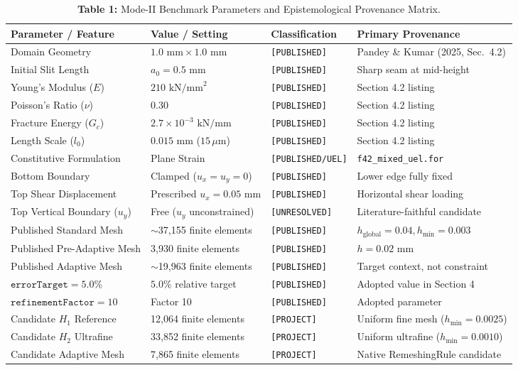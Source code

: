 \documentclass[11pt,a4paper]{article}
\begin{document}
\begin{table}[htbp]
\centering
\small
\caption{\textbf{Table 1:} Mode-II Benchmark Parameters and Epistemological Provenance Matrix.}
\label{tab:taxonomy}
\begin{tabularx}{\textwidth}{p{3.8cm}p{3.8cm}p{3.2cm}X}
\toprule
\textbf{Parameter / Feature} & \textbf{Value / Setting} & \textbf{Classification} & \textbf{Primary Provenance} \\
\midrule
Domain Geometry & $1.0\text{ mm} \times 1.0\text{ mm}$ & \texttt{[PUBLISHED]} & Pandey \& Kumar (2025, Sec.~4.2) \\
Initial Slit Length & $a_0 = 0.5\text{ mm}$ & \texttt{[PUBLISHED]} & Sharp seam at mid-height \\
Young's Modulus ($E$) & $210\text{ kN/mm}^2$ & \texttt{[PUBLISHED]} & Section 4.2 listing \\
Poisson's Ratio ($\nu$) & $0.30$ & \texttt{[PUBLISHED]} & Section 4.2 listing \\
Fracture Energy ($G_c$) & $2.7\times 10^{-3}\text{ kN/mm}$ & \texttt{[PUBLISHED]} & Section 4.2 listing \\
Length Scale ($l_0$) & $0.015\text{ mm}$ ($15\,\mu\text{m}$) & \texttt{[PUBLISHED]} & Section 4.2 listing \\
Constitutive Formulation & Plane Strain & \texttt{[PUBLISHED/UEL]} & \texttt{f42\_mixed\_uel.for} \\
Bottom Boundary & Clamped ($u_x=u_y=0$) & \texttt{[PUBLISHED]} & Lower edge fully fixed \\
Top Shear Displacement & Prescribed $u_x = 0.05\text{ mm}$ & \texttt{[PUBLISHED]} & Horizontal shear loading \\
Top Vertical Boundary ($u_y$) & Free ($u_y$ unconstrained) & \texttt{[UNRESOLVED]} & Literature-faithful candidate \\
Published Standard Mesh & $\sim$37,155 finite elements & \texttt{[PUBLISHED]} & $h_{\mathrm{global}}=0.04, h_{\min}=0.003$ \\
Published Pre-Adaptive Mesh & 3,930 finite elements & \texttt{[PUBLISHED]} & $h=0.02\text{ mm}$ \\
Published Adaptive Mesh & $\sim$19,963 finite elements & \texttt{[PUBLISHED]} & Target context, not constraint \\
$\mathtt{errorTarget}=5.0\%$ & $5.0\%$ relative target & \texttt{[PUBLISHED]} & Adopted value in Section 4 \\
$\mathtt{refinementFactor}=10$ & Factor 10 & \texttt{[PUBLISHED]} & Adopted parameter \\
Candidate $H_1$ Reference & 12,064 finite elements & \texttt{[PROJECT]} & Uniform fine mesh ($h_{\min}=0.0025$) \\
Candidate $H_2$ Ultrafine & 33,852 finite elements & \texttt{[PROJECT]} & Uniform ultrafine ($h_{\min}=0.0010$) \\
Candidate Adaptive Mesh & 7,865 finite elements & \texttt{[PROJECT]} & Native RemeshingRule candidate \\
\bottomrule
\end{tabularx}
\end{table}
\end{document}
